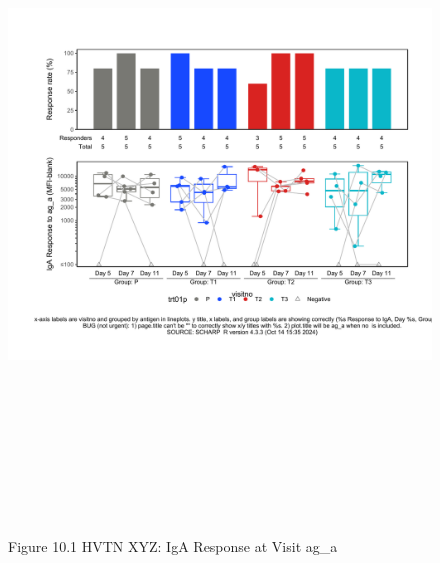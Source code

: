 \documentclass[12pt]{article}
\begin{document}
\begin{figure}[H]

{\centering \includegraphics[width=8.75in,height=7.25in]{test_cases_files/figure-latex/unnamed-chunk-20-1} 

}

\caption[Figure 10.1 lineplot (pos. response boxplots)]{Figure 10.1 HVTN XYZ: IgA Response at Visit ag\_a}\label{fig:unnamed-chunk-20}
\end{figure}
\clearpage
\end{document}
